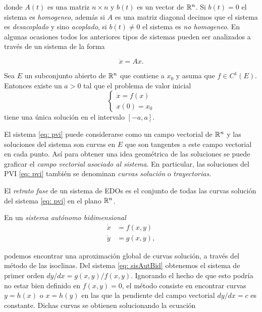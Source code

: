 donde $A(t)$ es una matriz $n \times n$ y $b(t)$ es un vector de ${\mathbb{R}}^{n}$. Si $b(t) = 0$ el sistema es \textit{homogeneo}, además si $A$ es una matriz diagonal decimos que el sistema es \textit{desacoplado} y sino \textit{acoplado}, si $b(t) \neq 0$ el sistema es \textit{no homogeneo}. En algunas ocasiones todos los anteriores tipos de sistemas pueden ser analizados a través de un sistema de la forma

\begin{equation}
	\dot{x} = Ax.
	\label{eq: sisLinAuto}
\end{equation}

\begin{teo}\label{teo: Existencia y unicidad}
	Sea $E$ un subconjunto abierto de ${\mathbb{R}}^{n}$ que contiene a $x_{0}$ y asuma que $f \in C^{1}(E)$. Entonces existe un $a>0$ tal que el problema de valor inicial 
	\begin{equation}
		\left\{
		\begin{aligned}
			\dot{x} = f(x) \\
			x(0) = x_{0}
		\end{aligned}
		\right.
		\label{eq: pvi}
	\end{equation}
	tiene una única solución en el intervalo $[-a,a]$.
\end{teo}

El sistema \eqref{eq: pvi} puede considerarse como un campo vectorial de ${\mathbb{R}}^{n}$ y las soluciones del sistema son curvas en $E$ que son tangentes a este campo vectorial en cada punto. Así para obtener una idea geométrica de las soluciones se puede graficar el \textit{campo vectorial asociado al sistema}. En particular, las soluciones del PVI \eqref{eq: pvi} también se denominan \textit{curvas solución} o \textit{trayectorias}.

El \textit{retrato fase} de un sistema de EDOs es el conjunto de todas las curvas solución del sistema \eqref{eq: pvi} en el plano ${\mathbb{R}}^{n}$.

En un \textit{sistema autónomo bidimensional}
\begin{equation}
	\begin{aligned}
		\dot{x} &= f(x, y) \\
		\dot{y} &= g(x, y),
	\end{aligned}
	\label{eq: sisAutBid}
\end{equation}

podemos encontrar una aproximación global de curvas solución, a través del método de las isoclinas. Del sistema \eqref{eq: sisAutBid} obtenemos el sistema de primer orden $dy/dx = g(x, y)/f(x, y)$. Ignorando el hecho de que esto podría no estar bien definido en $f(x, y) = 0$, el método consiste en encontrar curvas $y=h(x)$ o $x=h(y)$ en las que la pendiente del campo vectorial $dy/dx = c$ es constante. Dichas curvas se obtienen solucionando la ecuación

